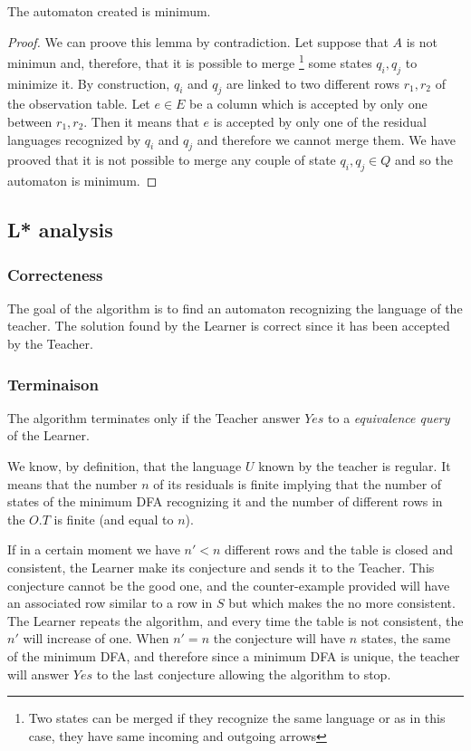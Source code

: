 \begin{lemma}
  The automaton created is minimum.
\end{lemma}

\begin{proof}
  We can proove this lemma by contradiction. Let suppose that $A$ is not minimun and, therefore, that it is possible to merge \footnote{Two states can be merged if they recognize the same language or as in this case, they have same incoming and outgoing arrows} some states $q_i, q_j$ to minimize it.
  By construction, $q_i$ and $q_j$ are linked to two different rows $r_1, r_2$ of the observation table.
  Let $e \in E$ be a column which is accepted by only one between $r_1, r_2$.
  Then it means that $e$ is accepted by only one of the residual languages recognized by $q_i$ and $q_j$ and therefore we cannot merge them.
  We have prooved that it is not possible to merge any couple of state $q_i, q_j \in Q$ and so the automaton is minimum.
\end{proof}

\subsection{L* analysis}
\subsubsection{Correcteness}
The goal of the algorithm is to find an automaton recognizing the language of the teacher. The solution found by the Learner is correct since it has been accepted by the Teacher.
\subsubsection{Terminaison}
The algorithm terminates only if the Teacher answer $Yes$ to a \textit{equivalence query} of the Learner.

We know, by definition, that the language $U$ known by the teacher is regular. It means that the number $n$ of its residuals is finite implying that the number of states of the minimum DFA recognizing it and the number of different rows in the $O.T$ is finite (and equal to $n$).

If in a certain moment we have $n' < n$ different rows and the table is closed and consistent, the Learner make its conjecture and sends it to the Teacher. This conjecture cannot be the good one, and the counter-example provided will have an associated row similar to a row in $S$ but which makes the \OT no more consistent. The Learner repeats the algorithm, and every time the table is not consistent, the $n'$ will increase of one. When $n' = n$ the conjecture will have $n$ states, the same of the minimum DFA, and therefore since a minimum DFA is unique, the teacher will answer $Yes$ to the last conjecture allowing the algorithm to stop.

